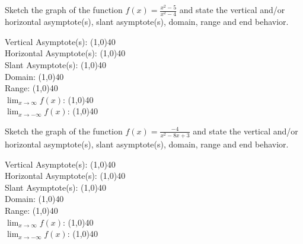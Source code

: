 \documentclass[addpoints]{exam}
\begin{document}
\begin{questions}
    \newpage
    
    \question[1] Sketch the graph of the function $f(x) = \frac{x^2 - 5}{x^2 - 4}$ and state the vertical and/or horizontal asymptote(s), slant asymptote(s), domain, range and end behavior.
    
        \begin{left} 
        \end{left}
    
    Vertical Asymptote(s): \line(1,0){40} \\
    \newline
    Horizontal Asymptote(s): \line(1,0){40} \\
    \newline
    Slant Asymptote(s): \line(1,0){40} \\
    \newline
    Domain: \line(1,0){40} \\
    \newline
    Range: \line(1,0){40} \\
    \newline
    $\lim_{x\to\infty} f(x)$: \line(1,0){40} \\
    \newline
    $\lim_{x\to-\infty} f(x)$: \line(1,0){40} \\
    
    \question[1] Sketch the graph of the function $f(x) = \frac{-4}{x^2-8x+3}$ and state the vertical and/or horizontal asymptote(s), slant asymptote(s), domain, range and end behavior.
    
        \begin{left} 
        \end{left}
    
    Vertical Asymptote(s): \line(1,0){40} \\
    \newline
    Horizontal Asymptote(s): \line(1,0){40} \\
    \newline
    Slant Asymptote(s): \line(1,0){40} \\
    \newline
    Domain: \line(1,0){40} \\
    \newline
    Range: \line(1,0){40} \\
    \newline
    $\lim_{x\to\infty} f(x)$: \line(1,0){40} \\
    \newline
    $\lim_{x\to-\infty} f(x)$: \line(1,0){40} \\
    

\end{questions}
\end{document}

